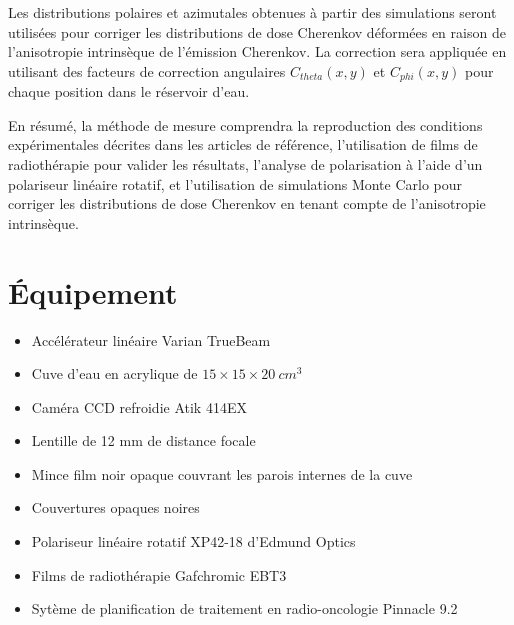 \documentclass{Thesis}
\begin{document}
Les distributions polaires et azimutales obtenues à partir des simulations seront utilisées pour corriger les distributions de dose Cherenkov déformées en raison de l'anisotropie intrinsèque de l'émission Cherenkov.
La correction sera appliquée en utilisant des facteurs de correction angulaires $C_{theta}(x, y)$ et $C_{phi}(x, y)$ pour chaque position dans le réservoir d'eau.

En résumé, la méthode de mesure comprendra la reproduction des conditions expérimentales décrites dans les articles de référence, l'utilisation de films de radiothérapie pour valider les résultats, l'analyse de polarisation à l'aide d'un polariseur linéaire rotatif, et l'utilisation de simulations Monte Carlo pour corriger les distributions de dose Cherenkov en tenant compte de l'anisotropie intrinsèque.

\section*{Équipement}
\begin{multicols}{2}
\begin{itemize}
    \setlength\itemsep{1mm}
    \item Accélérateur linéaire Varian TrueBeam
    \item Cuve d'eau en acrylique de $15 \times 15 \times \SI{20}{cm^3}$
    \item Caméra CCD refroidie Atik 414EX
    \item Lentille de 12 mm de distance focale
    \item Mince film noir opaque couvrant les parois internes de la cuve
    \item Couvertures opaques noires
    \item Polariseur linéaire rotatif XP42-18 d'Edmund Optics
    \item Films de radiothérapie Gafchromic EBT3
    \item Sytème de planification de traitement en radio-oncologie Pinnacle 9.2
\end{itemize}
\end{multicols}

\newpage
\printbibliography
\end{document}
